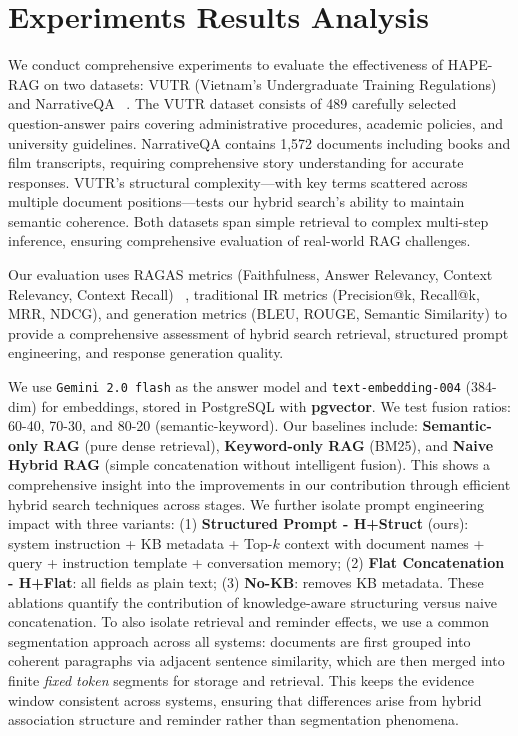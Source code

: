 \documentclass[10pt,twocolumn,letterpaper]{article}
\begin{document}
\section{Experiments Results Analysis}

We conduct comprehensive experiments to evaluate the effectiveness of HAPE-RAG on two datasets: VUTR (Vietnam's Undergraduate Training Regulations) and NarrativeQA ~\cite{kocisky2017narrativeqa}. The VUTR dataset consists of 489 carefully selected question-answer pairs covering administrative procedures, academic policies, and university guidelines. NarrativeQA contains 1,572 documents including books and film transcripts, requiring comprehensive story understanding for accurate responses. VUTR's structural complexity—with key terms scattered across multiple document positions—tests our hybrid search's ability to maintain semantic coherence. Both datasets span simple retrieval to complex multi-step inference, ensuring comprehensive evaluation of real-world RAG challenges.


\vspace{0.5em}
Our evaluation uses RAGAS metrics (Faithfulness, Answer Relevancy, Context Relevancy, Context Recall)  ~\cite{Es2025Ragas}, traditional IR metrics (Precision@k, Recall@k, MRR, NDCG), and generation metrics (BLEU, ROUGE, Semantic Similarity) to provide a comprehensive assessment of hybrid search retrieval, structured prompt engineering, and response generation quality.

\vspace{0.5em}
We use \texttt{Gemini 2.0 flash} as the answer model and \texttt{text-embedding-004} (384-dim) for embeddings, stored in PostgreSQL with \textbf{pgvector}. We test fusion ratios: 60-40, 70-30, and 80-20 (semantic-keyword). Our baselines include: \textbf{Semantic-only RAG} (pure dense retrieval), \textbf{Keyword-only RAG} (BM25), and \textbf{Naive Hybrid RAG} (simple concatenation without intelligent fusion). This shows a comprehensive insight into the improvements in our contribution through efficient hybrid search techniques across stages. We further isolate prompt engineering impact with three variants: (1) \textbf{Structured Prompt - H+Struct} (ours): system instruction + KB metadata + Top-$k$ context with document names + query + instruction template + conversation memory; (2) \textbf{Flat Concatenation - H+Flat}: all fields as plain text; (3) \textbf{No-KB}: removes KB metadata. These ablations quantify the contribution of knowledge-aware structuring versus naive concatenation. To also isolate retrieval and reminder effects, we use a common segmentation approach across all systems: documents are first grouped into coherent paragraphs via adjacent sentence similarity, which are then merged into finite \emph{fixed token} segments for storage and retrieval. This keeps the evidence window consistent across systems, ensuring that differences arise from hybrid association structure and reminder rather than segmentation phenomena.
\end{document}

